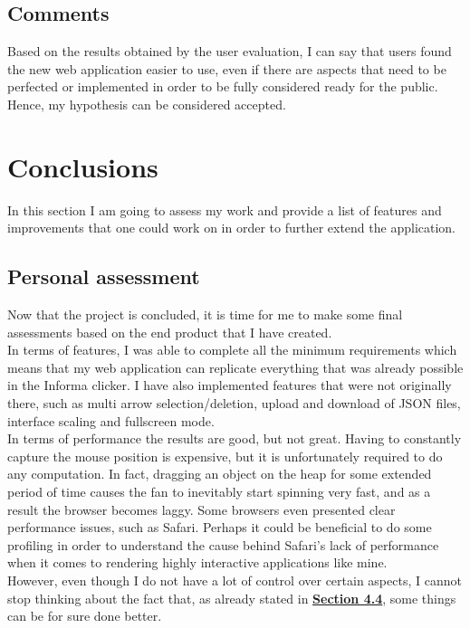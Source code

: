 \documentclass[]{usiinfbachelorproject}
\begin{document}
\subsection{Comments}

Based on the results obtained by the user evaluation, I can say that users found the new web application easier to use, even if there are aspects that need to be perfected or implemented in order to be fully considered ready for the public. Hence, my hypothesis can be considered accepted.

\vspace{\fill}
\pagebreak

\section{Conclusions} \label{Conclusions}

In this section I am going to assess my work and provide a list of features and improvements that one could work on in order to further extend the application.

\subsection{Personal assessment}

Now that the project is concluded, it is time for me to make some final assessments based on the end product that I have created. \\
In terms of features, I was able to complete all the minimum requirements which means that my web application can replicate everything that was already possible in the Informa clicker. I have also implemented features that were not originally there, such as multi arrow selection/deletion, upload and download of JSON files, interface scaling and fullscreen mode.\\
In terms of performance the results are good, but not great. Having to constantly capture the mouse position is expensive, but it is unfortunately required to do any computation. In fact, dragging an object on the heap for some extended period of time causes the fan to inevitably start spinning very fast, and as a result the browser becomes laggy. Some browsers even presented clear performance issues, such as Safari. Perhaps it could be beneficial to do some profiling in order to understand the cause behind Safari's lack of performance when it comes to rendering highly interactive applications like mine. \\
However, even though I do not have a lot of control over certain aspects, I cannot stop thinking about the fact that, as already stated in \hyperref[storing states]{\textbf{Section 4.4}}, some things can be for sure done better.
\end{document}
